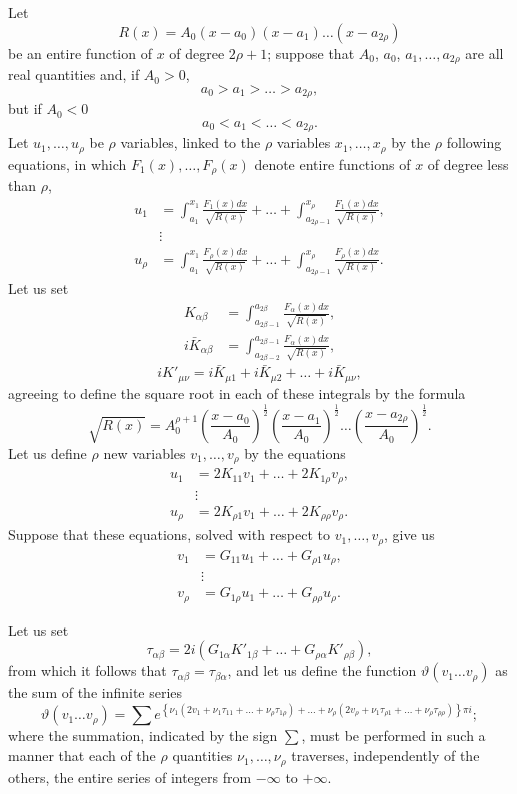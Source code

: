 \documentclass{article}
\begin{document}
Let
\[
R(x) = A_0(x - a_0)(x - a_1)\ldots(x - a_{2\rho})
\]
be an entire function of $x$ of degree $2\rho + 1$; suppose that $A_0$, $a_0$, $a_1, \ldots, a_{2\rho}$ are all real quantities and, if $A_0 > 0$,
\[
a_0 > a_1 > \ldots > a_{2\rho},
\]
but if $A_0 < 0$
\[
a_0 < a_1 < \ldots < a_{2\rho}.
\]
Let $u_1, \ldots, u_\rho$ be $\rho$ variables, linked to the $\rho$ variables $x_1, \ldots, x_\rho$ by the $\rho$ following equations, in which $F_1(x), \ldots, F_\rho(x)$ denote entire functions of $x$ of degree less than $\rho$,
\begin{align*}
u_1 &= \int_{a_1}^{x_1} \frac{F_1(x)dx}{\sqrt{R(x)}} + \ldots + \int_{a_{2\rho-1}}^{x_\rho} \frac{F_1(x)dx}{\sqrt{R(x)}}, \\
&\vdots \\
u_\rho &= \int_{a_1}^{x_1} \frac{F_\rho(x)dx}{\sqrt{R(x)}} + \ldots + \int_{a_{2\rho-1}}^{x_\rho} \frac{F_\rho(x)dx}{\sqrt{R(x)}}.
\end{align*}
Let us set
\begin{align*}
K_{\alpha\beta} &= \int_{a_{2\beta-1}}^{a_{2\beta}} \frac{F_\alpha(x)dx}{\sqrt{R(x)}}, \\
i\bar{K}_{\alpha\beta} &= \int_{a_{2\beta-2}}^{a_{2\beta-1}} \frac{F_\alpha(x)dx}{\sqrt{R(x)}},
\end{align*}
\[
iK'_{\mu\nu} = i\bar{K}_{\mu 1} + i\bar{K}_{\mu 2} + \ldots + i\bar{K}_{\mu\nu},
\]
agreeing to define the square root in each of these integrals by the formula
\[
\sqrt{R(x)} = A_0^{\rho+1}\left(\frac{x - a_0}{A_0}\right)^{\frac{1}{2}}\left(\frac{x - a_1}{A_0}\right)^{\frac{1}{2}}\ldots\left(\frac{x - a_{2\rho}}{A_0}\right)^{\frac{1}{2}}.
\]
Let us define $\rho$ new variables $v_1, \ldots, v_\rho$ by the equations
\begin{align*}
u_1 &= 2K_{11}v_1 + \ldots + 2K_{1\rho}v_\rho, \\
&\vdots \\
u_\rho &= 2K_{\rho 1}v_1 + \ldots + 2K_{\rho\rho}v_\rho.
\end{align*}
Suppose that these equations, solved with respect to $v_1, \ldots, v_\rho$, give us
\begin{align*}
v_1 &= G_{11}u_1 + \ldots + G_{\rho 1}u_\rho, \\
&\vdots \\
v_\rho &= G_{1\rho}u_1 + \ldots + G_{\rho\rho}u_\rho.
\end{align*}

Let us set
\[
\tau_{\alpha\beta} = 2i(G_{1\alpha}K'_{1\beta} + \ldots + G_{\rho\alpha}K'_{\rho\beta}),
\]
from which it follows that $\tau_{\alpha\beta} = \tau_{\beta\alpha}$, and let us define the function $\vartheta(v_1\ldots v_\rho)$ as the sum of the infinite series
\[
\vartheta(v_1\ldots v_\rho) = \sum e^{\left\{\nu_1(2v_1 + \nu_1\tau_{11} + \ldots + \nu_\rho\tau_{1\rho}) + \ldots + \nu_\rho(2v_\rho + \nu_1\tau_{\rho 1} + \ldots + \nu_\rho\tau_{\rho\rho})\right\}\pi i};
\]
where the summation, indicated by the sign $\sum$, must be performed in such a manner that each of the $\rho$ quantities $\nu_1, \ldots, \nu_\rho$ traverses, independently of the others, the entire series of integers from $-\infty$ to $+\infty$.
\end{document}
